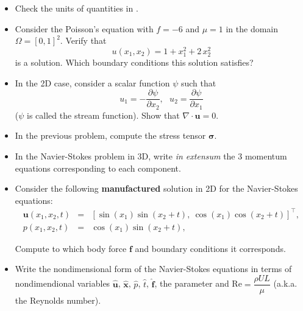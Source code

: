 \begin{kaobox}[frametitle=Exercices]

\begin{itemize}
\item Check the units of quantities in . \\

\item Consider the Poisson's equation with $f = -6$ and $\mu = 1$
in the domain $\Omega = [0,1]^2$. Verify that 
\begin{equation}
u(x_1,x_2) = 1 + x_1^2 + 2\,x_2^2
\end{equation}
is a solution. Which boundary conditions this solution satisfies?\\

\item In the 2D case, consider a scalar function $\psi$ such that
\begin{equation}
u_1 = -\dfrac{\partial{\psi}}{\partial{x_2}},~~~u_2 = \dfrac{\partial{\psi}}{\partial{x_1}}
\end{equation}
($\psi$ is called the stream function). Show that $\nabla \cdot {\mathbf{u}} = 0$.\\

\item In the previous problem, compute the stress tensor $\boldsymbol{\sigma}$.\\


\item In the Navier-Stokes problem in 3D, write \emph{in extensum} the 3 momentum equations
corresponding to each component.\\

\item Consider the following \textbf{manufactured} solution in 2D for
the Navier-Stokes equations:
\begin{eqnarray}
\mathbf{u}(x_1,x_2,t) & = & \left [ \sin(x_1)\sin(x_2 + t), ~\cos(x_1)\cos(x_2 + t)\right]^{\intercal},\nonumber \\
p(x_1,x_2,t) & = & \cos(x_1) \sin(x_2 + t),\nonumber
\end{eqnarray}

Compute to which body force $\mathbf{f}$ and boundary conditions it corresponds.\\

\item Write the nondimensional form of the Navier-Stokes equations in terms
of nondimendional variables $\hat{\mathbf{u}}$, $\hat{\mathbf{x}}$, $\hat{p}$,
$\hat{t}$, $\hat{\mathbf{f}}$, the parameter and
Re$=\dfrac{\rho U L}{\mu}$ (a.k.a. the Reynolds number).

\end{itemize}

\end{kaobox}


